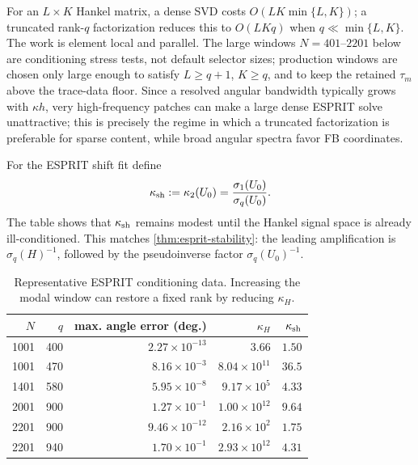 \documentclass[11pt]{article}
\numberwithin{equation}{section}
\begin{document}
For an $L\times K$ Hankel matrix, a dense SVD costs $O(LK\min\{L,K\})$; a truncated rank-$q$ factorization reduces this to $O(LKq)$ when $q\ll\min\{L,K\}$.  The work is element local and parallel.  The large windows $N=401$--$2201$ below are conditioning stress tests, not default selector sizes; production windows are chosen only large enough to satisfy $L\ge q+1$, $K\ge q$, and to keep the retained $\tau_m$ above the trace-data floor.  Since a resolved angular bandwidth typically grows with $\kappa h$, very high-frequency patches can make a large dense ESPRIT solve unattractive; this is precisely the regime in which a truncated factorization is preferable for sparse content, while broad angular spectra favor FB coordinates.

For the ESPRIT shift fit define
\begin{equation}\label{eq:kappa-sh}
 \kappa_{\rm sh}:=\kappa_2(U_0)=\frac{\sigma_1(U_0)}{\sigma_q(U_0)}.
\end{equation}
The table shows that $\kappa_{\rm sh}$ remains modest until the Hankel signal space is already ill-conditioned.  This matches \cref{thm:esprit-stability}: the leading amplification is $\sigma_q(H)^{-1}$, followed by the pseudoinverse factor $\sigma_q(U_0)^{-1}$.

\begin{table}[!htbp]
\centering
\caption{Representative ESPRIT conditioning data.  Increasing the modal window can restore a fixed rank by reducing $\kappa_H$.}
\label{tab:esprit-conditioning}
\footnotesize
\begin{tabular}{rrrrr}
\toprule
$N$ & $q$ & max. angle error (deg.) & $\kappa_H$ & $\kappa_{\rm sh}$\\
\midrule
1001 & 400 & $2.27\times10^{-13}$ & $3.66$ & $1.50$\\
1001 & 470 & $8.16\times10^{-3}$ & $8.04\times10^{11}$ & $36.5$\\
1401 & 580 & $5.95\times10^{-8}$ & $9.17\times10^{5}$ & $4.33$\\
2001 & 900 & $1.27\times10^{-1}$ & $1.00\times10^{12}$ & $9.64$\\
2201 & 900 & $9.46\times10^{-12}$ & $2.16\times10^{2}$ & $1.75$\\
2201 & 940 & $1.70\times10^{-1}$ & $2.93\times10^{12}$ & $4.31$\\
\bottomrule
\end{tabular}
\end{table}
\FloatBarrier
\end{document}
